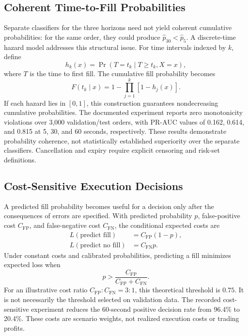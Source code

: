\documentclass[11pt,a4paper]{article}
\begin{document}
\subsection{Coherent Time-to-Fill Probabilities}
Separate classifiers for the three horizons need not yield coherent cumulative probabilities: for the same order, they could produce $\hat p_{30}<\hat p_5$. A discrete-time hazard model addresses this structural issue. For time intervals indexed by $k$, define
\begin{equation}
h_k(x)=\Pr(T=t_k\mid T\geq t_k, X=x),
\label{eq:hazard}
\end{equation}
where $T$ is the time to first fill. The cumulative fill probability becomes
\begin{equation}
F(t_k\mid x)=1-\prod_{j=1}^{k}\left[1-h_j(x)\right].
\label{eq:hazard_cdf}
\end{equation}
If each hazard lies in $[0,1]$, this construction guarantees nondecreasing cumulative probabilities. The documented experiment reports zero monotonicity violations over 3,000 validation/test orders, with PR-AUC values of 0.162, 0.614, and 0.815 at 5, 30, and 60 seconds, respectively. These results demonstrate probability coherence, not statistically established superiority over the separate classifiers. Cancellation and expiry require explicit censoring and risk-set definitions.

\subsection{Cost-Sensitive Execution Decisions}
A predicted fill probability becomes useful for a decision only after the consequences of errors are specified. With predicted probability $p$, false-positive cost $C_{\mathrm{FP}}$, and false-negative cost $C_{\mathrm{FN}}$, the conditional expected costs are
\begin{align}
L(\text{predict fill}) &= C_{\mathrm{FP}}(1-p),\\
L(\text{predict no fill}) &= C_{\mathrm{FN}}p.
\end{align}
Under constant costs and calibrated probabilities, predicting a fill minimizes expected loss when
\begin{equation}
p>\frac{C_{\mathrm{FP}}}{C_{\mathrm{FP}}+C_{\mathrm{FN}}}.
\label{eq:cost_threshold}
\end{equation}
For an illustrative cost ratio $C_{\mathrm{FP}}:C_{\mathrm{FN}}=3:1$, this theoretical threshold is $0.75$. It is not necessarily the threshold selected on validation data. The recorded cost-sensitive experiment reduces the 60-second positive decision rate from 96.4\% to 20.4\%. These costs are scenario weights, not realized execution costs or trading profits.
\end{document}
